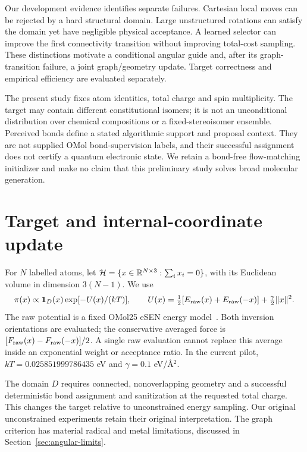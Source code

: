 Our development evidence identifies separate failures. Cartesian local moves can
be rejected by a hard structural domain. Large unstructured rotations can satisfy
the domain yet have negligible physical acceptance. A learned selector can improve
the first connectivity transition without improving total-cost sampling. These
distinctions motivate a conditional angular guide and, after its graph-transition
failure, a joint graph/geometry update. Target correctness and empirical
efficiency are evaluated separately.

The present study fixes atom identities, total charge and spin multiplicity.
The target may contain different constitutional isomers; it is not an unconditional
distribution over chemical compositions or a fixed-stereoisomer ensemble. Perceived
bonds define a stated algorithmic support and proposal context. They are not supplied
OMol bond-supervision labels, and their successful assignment does not certify a
quantum electronic state. We retain a bond-free flow-matching initializer and make
no claim that this preliminary study solves broad molecular generation.

\section{Target and internal-coordinate update}
For $N$ labelled atoms, let $\mathcal H=\{x\in\mathbb R^{N\times 3}:\sum_i x_i=0\}$,
with its Euclidean volume in dimension $3(N-1)$. We use
\begin{equation}
 \pi(x)\propto {\bf 1}_{D}(x)\exp[-U(x)/(kT)],\qquad
 U(x)=\tfrac 12[E_{\rm raw}(x)+E_{\rm raw}(-x)]+\tfrac\gamma 2\|x\|^2.
 \label{eq:angular-target}
\end{equation}
The raw potential is a fixed OMol25 eSEN energy model~\citep{esen}. Both inversion orientations are
evaluated; the conservative averaged force is
$[F_{\rm raw}(x)-F_{\rm raw}(-x)]/2$. A single raw evaluation cannot replace this
average inside an exponential weight or acceptance ratio. In the current pilot,
$kT=0.025851999786435$ eV and $\gamma=0.1$ eV/\AA$^2$.

The domain $D$ requires connected, nonoverlapping geometry and a successful
deterministic bond assignment and sanitization at the requested total charge.
This changes the target relative to unconstrained energy sampling. Our original
unconstrained experiments retain their original interpretation. The graph criterion
has material radical and metal limitations, discussed in Section~\ref{sec:angular-limits}.

